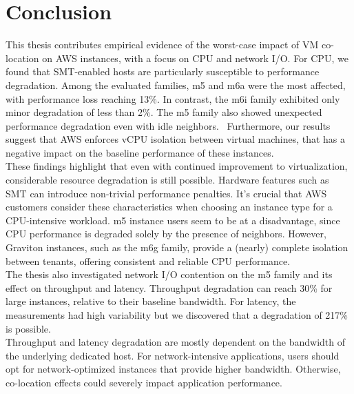 \chapter{Conclusion}\label{chapter:conclusion}

This thesis contributes empirical evidence of the worst-case impact of VM co-location on AWS instances, 
with a focus on CPU and network I/O.
For CPU, we found that \ac{SMT}-enabled hosts are particularly susceptible to 
performance degradation. Among the evaluated families, m5 and m6a were the most affected, 
with performance loss reaching 13\%.
In contrast, the m6i family exhibited only minor degradation of less than 2\%.
The m5 family also showed unexpected performance degradation even with idle neighbors. \
Furthermore, our results suggest that AWS enforces vCPU isolation between virtual machines, 
that has a negative impact on the baseline performance of these instances. \\ 
These findings highlight that even with continued improvement to virtualization, considerable 
resource degradation is still possible. Hardware features such as \ac{SMT}
can introduce non-trivial performance penalties. It's crucial that AWS
customers consider these characteristics when choosing an instance type for a CPU-intensive workload. 
m5 instance users seem to be at a disadvantage, since CPU performance is degraded
solely by the presence of neighbors. However, Graviton instances, such as the m6g family,
provide a (nearly) complete isolation between tenants, offering consistent and reliable CPU performance.\\ 
The thesis also investigated network I/O contention on the m5 family and its effect 
on throughput and latency. Throughput degradation can reach 30\% for large instances, relative 
to their baseline bandwidth. For latency, the measurements had high variability but we discovered that 
a degradation of 217\% is possible. \\
Throughput and latency degradation are mostly dependent on the bandwidth of the underlying 
dedicated host. For network-intensive applications, users should opt for network-optimized
instances that provide higher bandwidth. Otherwise, co-location effects could severely impact 
application performance. 